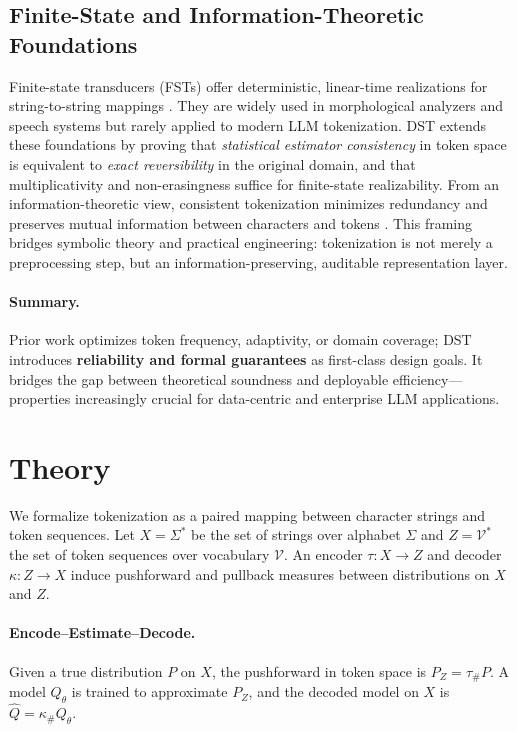 \subsection{Finite-State and Information-Theoretic Foundations}

Finite-state transducers (FSTs) offer deterministic, linear-time realizations for string-to-string mappings \citep{Mohri2004FST, Roark2011GrammarTokenization}.
They are widely used in morphological analyzers and speech systems but rarely applied to modern LLM tokenization.
DST extends these foundations by proving that \emph{statistical estimator consistency} in token space is equivalent to \emph{exact reversibility} in the original domain, and that multiplicativity and non-erasingness suffice for finite-state realizability.
From an information-theoretic view, consistent tokenization minimizes redundancy and preserves mutual information between characters and tokens \citep{JurafskyMartin2023SpeechNLP, Ding2023ByteLevelTradeoff}.
This framing bridges symbolic theory and practical engineering: tokenization is not merely a preprocessing step, but an information-preserving, auditable representation layer.

\paragraph{Summary.}
Prior work optimizes token frequency, adaptivity, or domain coverage; DST introduces \textbf{reliability and formal guarantees} as first-class design goals.
It bridges the gap between theoretical soundness and deployable efficiency—properties increasingly crucial for data-centric and enterprise LLM applications.


\section{Theory}
\label{sec:theory}

\noindent We formalize tokenization as a paired mapping between character strings and token sequences.
Let $X=\Sigma^*$ be the set of strings over alphabet $\Sigma$ and $Z=\mathcal{V}^*$ the set of token sequences over vocabulary $\mathcal{V}$. An encoder $\tau\!:\!X\to Z$ and decoder $\kappa\!:\!Z\to X$ induce pushforward and pullback measures between distributions on $X$ and $Z$.

\paragraph{Encode–Estimate–Decode.}
Given a true distribution $P$ on $X$, the pushforward in token space is $P_Z=\tau_{\#}P$. A model $Q_\theta$ is trained to approximate $P_Z$, and the decoded model on $X$ is $\widehat{Q}=\kappa_{\#}Q_\theta$.

